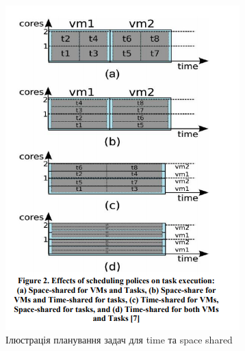 \begin{figure}[H]
	\centering
	\includegraphics[width=\textwidth]{task_analysis/img/time_space_shared}
	\caption{Ілюстрація планування задач для time та space shared }
	\label{fig:time_space_shared}
\end{figure}

